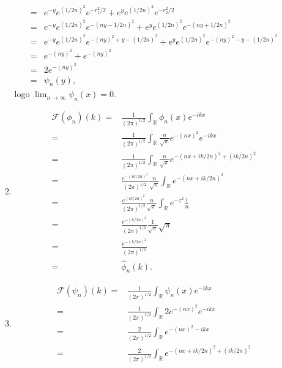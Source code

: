 \documentclass{article}
\begin{document}
\begin{enumerate}
\begin{enumerate}
$$\begin{aligned}
					\\
					= & e^{-y}e^{(1/2n)^{2}} e^{-r_{1}^{2}/2}+ e^{y}e^{(1/2n)^{2}} e^{-r_{2}^{2}/2}
					\\
					= & e^{-y}e^{(1/2n)^{2}} e^{-(ny-1/2n)^{2}}+ e^{y}e^{ (1/2n)^{2}} e^{-(ny+1/2n)^{2}}
					\\
					= & e^{-y}e^{(1/2n)^{2}} e^{-(ny)^{2}+y - (1/2n)^{2}}+ e^{y}e^{ (1/2n)^{2}}e^{-(ny)^{2}-y - (1/2n)^{2}}
					\\
					= &  e^{-(ny)^{2}}+ e^{-(ny)^{2}}
					\\
					= & 2e^{-(ny)^{2}}
					\\
					= & \psi_{n}(y),
					\end{aligned}
					$$
					logo $\lim_{n \to \infty} \psi_{n}(x) = 0$.
					
					\item
						$$
						\begin{aligned}
						\mathcal{F}(\phi_{n})(k) = & \frac{1}{(2\pi)^{1/2}}\int_{\mathbb{R}} \phi_{n}(x)e^{-ikx}
						\\
						 = & \frac{1}{(2\pi)^{1/2}}\int_{\mathbb{R}} \frac{n}{\sqrt{\pi}}e^{-(nx)^{2}} e^{-ikx}
						 \\
						 = & \frac{1}{(2\pi)^{1/2}}\int_{\mathbb{R}} \frac{n}{\sqrt{\pi}}e^{-(nx + ik/2n)^{2} + (ik/2n)^{2}}
						 \\
						 = & \frac{e^{-(ik/2n)^{2}}}{(2\pi)^{1/2}} \frac{n}{\sqrt{\pi}} \int_{\mathbb{R}} e^{-(nx + ik/2n)^{2}}
						 \\
						 = & \frac{e^{(ik/2n)^{2}}}{(2\pi)^{1/2}} \frac{n}{\sqrt{\pi}} \int_{\mathbb{R}} e^{-z^{2}} \frac{1}{n}
						 \\
						 = & \frac{e^{-(k/2n)^{2}}}{(2\pi)^{1/2}} \frac{1}{\sqrt{\pi}} \sqrt{\pi}
						 \\
						 = & \frac{e^{-(k/2n)^{2}}}{(2\pi)^{1/2}}
						 \\
						 = & \hat{\phi}_{n}(k).
						\end{aligned}
						$$
					\item 
					$$
					\begin{aligned}
					\mathcal{F}(\psi_{n})(k) = & \frac{1}{(2\pi)^{1/2}}\int_{\mathbb{R}} \psi_{n}(x)e^{-ikx}
					\\
					= & \frac{1}{(2\pi)^{1/2}}\int_{\mathbb{R}}  2 e^{-(nx)^{2}}e^{-ikx}
					\\
					= & \frac{2}{(2\pi)^{1/2}}\int_{\mathbb{R}} e^{-(nx)^{2} -ikx }
					\\
					= & \frac{2}{(2\pi)^{1/2}}\int_{\mathbb{R}} e^{-(nx + ik/2n)^{2} + (ik/2n)^{2}}

\end{aligned}$$
\end{enumerate}
\end{enumerate}
\end{document}
